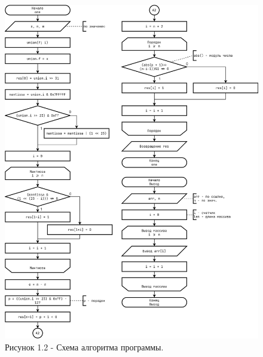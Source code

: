 \documentclass[oneside,a4paper,14pt]{extarticle}
\begin{document}
\begin{figure}[h!]
	\centering
    \includegraphics[height=0.9\textheight]{pics/5_flowchart_p2.png}
	\caption*{Рисунок 1.2 - Схема алгоритма программы.}
\end{figure}
\end{document}
